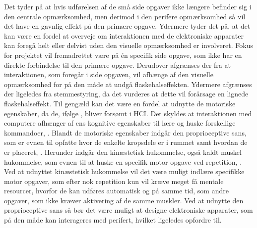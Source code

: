 Det tyder på at hvis udførelsen af de små side opgaver ikke længere befinder sig i den centrale opmærksomhed, men derimod i den perifere opmærksomhed så vil det have en gavnlig effekt på den primære opgave. Ydermere tyder det på, at det kan være en fordel at overveje om interaktionen med de elektroniske apparater kan foregå helt eller delvist uden den visuelle opmærksomhed er involveret. Fokus for projektet vil fremadrettet være på én specifik side opgave, som ikke har en direkte forbindelse til den primære opgave. Derudover afgrænses der fra at interaktionen, som foregår i side opgaven, vil afhænge af den visuelle opmærksomhed for på den måde at undgå flaskehalseffekten. Ydermere afgrænses der ligeledes fra stemmestyring, da det vurderes at dette vil forårsage en lignede flaskehalseffekt. Til gengæld kan det være en fordel at udnytte de motoriske egenskaber, da de, ifølge \textcite[s. 187]{PDF:PeripheralInteraction}, bliver forsømt i HCI. Det skyldes at interaktionen med computere afhænger af ens kognitive egenskaber til lære og huske forskellige kommandoer, \parencite[s. 187]{PDF:PeripheralInteraction}. Blandt de motoriske egenskaber indgår den proprioceptive sans, som er evnen til opfatte hvor de enkelte kropsdele er i rummet samt hvordan de er placeret, \parencite[s. 193]{PDF:PeripheralInteraction}. Herunder indgår den kinæstetisk hukommelse, også kaldt muskel hukommelse, som evnen til at huske en specifik motor opgave ved repetition, \parencite[s. 193]{PDF:PeripheralInteraction}. Ved at udnyttet kinæstetisk hukommelse vil det være muligt indlære specifikke motor opgaver, som efter nok repetition kun vil kræve meget få mentale resourcer, hvorfor de kan udføres automatisk og på samme tid, som andre opgaver, som ikke kræver aktivering af de samme muskler. Ved at udnytte den proprioceptive sans så bør det være muligt at designe elektroniske apparater, som på den måde kan interageres med perifert, hvilket \textcite[s. 202]{PDF:PeripheralInteraction} ligeledes opfordre til.        	    






 
